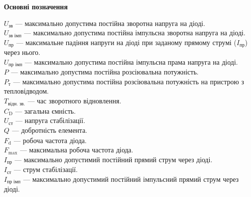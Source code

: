 \documentclass[a4paper,14pt]{extreport}
\begin{document}
\newpage
\begin{center}\bf{\Large{Основні позначення}}\end{center}\par

$U_{\text{зв}}$ --- максимально допустима постійна зворотна напруга на діоді.\\

$U_{\text{зв імп}}$ --- максимально допустима постійна імпульсна зворотна напруга на діоді.\\

$U_{\text{пр}}$ --- максимальне падіння напруги на діоді при заданому прямому струмі ($I_{\text{пр}}$) через нього.\\

$U_{\text{пр імп}}$ --- максимально допустима постійна імпульсна прама напруга на діоді.\\

$P_{\text{}}$ --- максимально допустима постійна розсіювальна потужність.\\

$P_{\text{т}}$ --- максимально допустима постійна розсіювальна потужність на пристрою з тепловідводом.\\

$T_{\text{відн. зв.}}$ --- час зворотного відновлення.\\

$C_{\text{D}}$ --- загальна ємність.\\

$U_{\text{ст}}$ --- напруга стабілізації.\\

$Q_{\text{}}$ --- добротність елемента.\\

$F_{\text{d}}$ --- робоча частота діода.\\

$F_{\text{max}}$ --- максимальна робоча частота діода.\\

$I_{\text{пр}}$ --- максимально допустимий постійний прямий струм через діоді.\\

$I_{\text{ст}}$ --- струм стабілізації.\\

$I_{\text{пр імп}}$ --- максимально допустимий постійний імпульсний прямий струм через діоді.\\
\end{document}
